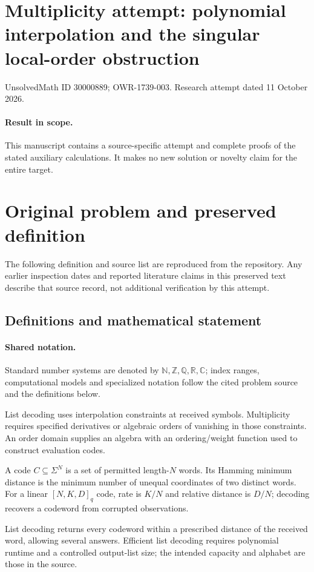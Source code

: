 \documentclass[11pt]{article}
\begin{document}
\section*{Multiplicity attempt: polynomial interpolation and the singular local-order obstruction}
\noindent UnsolvedMath ID 30000889; OWR-1739-003. Research attempt dated 11 October 2026.
\paragraph{Result in scope.}This manuscript contains a source-specific attempt and complete proofs of the stated auxiliary calculations. It makes no new solution or novelty claim for the entire target.
\section{Original problem and preserved definition}
The following definition and source list are reproduced from the repository. Any earlier inspection dates and reported literature claims in this preserved text describe that source record, not additional verification by this attempt.
\subsection{Definitions and mathematical statement}

\paragraph{Shared notation.}Standard number systems are denoted by $\mathbb N,\mathbb Z,\mathbb Q,\mathbb R,\mathbb C$; index ranges, computational models and specialized notation follow the cited problem source and the definitions below.


List decoding uses interpolation constraints at received symbols. Multiplicity requires specified derivatives or algebraic orders of vanishing in those constraints. An order domain supplies an algebra with an ordering/weight function used to construct evaluation codes.

A code $C\subseteq\Sigma^N$ is a set of permitted length-$N$ words. Its Hamming minimum distance is the minimum number of unequal coordinates of two distinct words. For a linear $[N,K,D]_q$ code, rate is $K/N$ and relative distance is $D/N$; decoding recovers a codeword from corrupted observations.

List decoding returns every codeword within a prescribed distance of the received word, allowing several answers. Efficient list decoding requires polynomial runtime and a controlled output-list size; the intended capacity and alphabet are those in the source.
\end{document}
